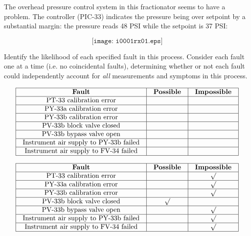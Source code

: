 

The overhead pressure control system in this fractionator seems to have a problem.  The controller (PIC-33) indicates the pressure being over setpoint by a substantial margin: the pressure reads 48 PSI while the setpoint is 37 PSI:

$$\texttt{[image: i0001rx01.eps]}$$

Identify the likelihood of each specified fault in this process.  Consider each fault one at a time (i.e. no coincidental faults), determining whether or not each fault could independently account for {\it all} measurements and symptoms in this process.


$$\vbox{\offinterlineskip
\halign{\strut
\vrule \quad\hfil # \ \hfil & 
\vrule \quad\hfil # \ \hfil & 
\vrule \quad\hfil # \ \hfil \vrule \cr
\noalign{\hrule}
%
{\bf Fault} & {\bf Possible} & {\bf Impossible} \cr
%
\noalign{\hrule}
%
PT-33 calibration error &  &  \cr
%
\noalign{\hrule}
%
PY-33a calibration error &  &  \cr
%
\noalign{\hrule}
%
PY-33b calibration error &  &  \cr
%
\noalign{\hrule}
%
PV-33b block valve closed &  &  \cr
%
\noalign{\hrule}
%
PV-33b bypass valve open &  &  \cr
%
\noalign{\hrule}
%
Instrument air supply to PY-33b failed &  &  \cr
%
\noalign{\hrule}
%
Instrument air supply to FV-34 failed &  &  \cr
%
\noalign{\hrule}
} %
}$$ %








$$\vbox{\offinterlineskip
\halign{\strut
\vrule \quad\hfil # \ \hfil & 
\vrule \quad\hfil # \ \hfil & 
\vrule \quad\hfil # \ \hfil \vrule \cr
\noalign{\hrule}
%
{\bf Fault} & {\bf Possible} & {\bf Impossible} \cr
%
\noalign{\hrule}
%
PT-33 calibration error &  & $\surd$ \cr
%
\noalign{\hrule}
%
PY-33a calibration error &  & $\surd$ \cr
%
\noalign{\hrule}
%
PY-33b calibration error &  & $\surd$ \cr
%
\noalign{\hrule}
%
PV-33b block valve closed & $\surd$ &  \cr
%
\noalign{\hrule}
%
PV-33b bypass valve open &  & $\surd$ \cr
%
\noalign{\hrule}
%
Instrument air supply to PY-33b failed &  & $\surd$ \cr
%
\noalign{\hrule}
%
Instrument air supply to FV-34 failed &  & $\surd$ \cr
%
\noalign{\hrule}
} %
}$$ %

